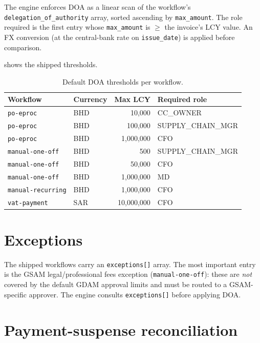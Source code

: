 \documentclass[11pt,a4paper,twoside]{report}
\begin{document}
The engine enforces DOA as a linear scan of the workflow's
\texttt{delegation\_of\_authority} array, sorted ascending by
\texttt{max\_amount}. The role required is the first entry whose
\texttt{max\_amount} is $\geq$ the invoice's LCY value. An FX
conversion (at the central-bank rate on \texttt{issue\_date}) is
applied before comparison.

 shows the shipped thresholds.

\begin{table}[htbp]
\centering
\caption{Default DOA thresholds per workflow.}
\label{tab:doa}
\small
\begin{tabularx}{\linewidth}{@{}l l r l@{}}
\toprule
\textbf{Workflow} & \textbf{Currency} & \textbf{Max LCY} & \textbf{Required role} \\ \midrule
\texttt{po-eproc}        & BHD &    10{,}000 & CC\_OWNER \\
\texttt{po-eproc}        & BHD &   100{,}000 & SUPPLY\_CHAIN\_MGR \\
\texttt{po-eproc}        & BHD & 1{,}000{,}000 & CFO \\
\texttt{manual-one-off}  & BHD &      500 & SUPPLY\_CHAIN\_MGR \\
\texttt{manual-one-off}  & BHD &   50{,}000 & CFO \\
\texttt{manual-one-off}  & BHD & 1{,}000{,}000 & MD \\
\texttt{manual-recurring}& BHD & 1{,}000{,}000 & CFO \\
\texttt{vat-payment}     & SAR & 10{,}000{,}000 & CFO \\
\bottomrule
\end{tabularx}
\end{table}

\section{Exceptions}

The shipped workflows carry an \texttt{exceptions[]} array. The most
important entry is the GSAM legal/professional fees exception
(\texttt{manual-one-off}): these are \emph{not} covered by the default
GDAM approval limits and must be routed to a GSAM-specific approver. The
engine consults \texttt{exceptions[]} before applying DOA.

\section{Payment-suspense reconciliation}
\end{document}
